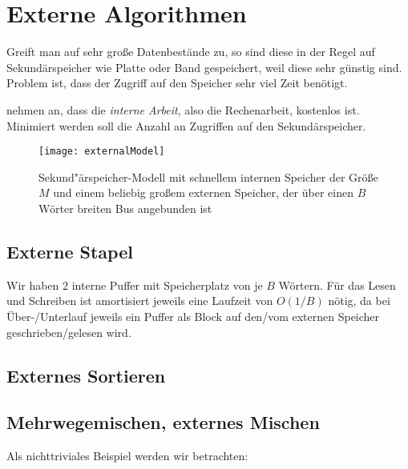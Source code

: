 \chapter{Externe Algorithmen}

\begin{minipage}{.6\textwidth}
  Greift man auf sehr große Datenbestände zu, so sind diese in der Regel auf Sekundärspeicher wie Platte oder Band gespeichert, weil diese sehr günstig sind. Problem ist, dass der Zugriff auf den Speicher sehr viel Zeit benötigt.
  
   nehmen an, dass die \emph{interne Arbeit}, also die Rechenarbeit, kostenlos ist. Minimiert werden soll die Anzahl an Zugriffen auf den Sekundärspeicher.
\end{minipage}
\hfill
\begin{minipage}{.35\textwidth}
  \begin{figure}[H]
    \texttt{[image: externalModel]}
    \caption{Sekund"ärspeicher-Modell mit schnellem internen Speicher der Größe \( M \) und einem beliebig großem externen Speicher, der über einen \( B \) Wörter breiten Bus angebunden ist}
  \end{figure}
\end{minipage}

\section{Externe Stapel}
Wir haben 2 interne Puffer mit Speicherplatz von je $B$ Wörtern. Für das Lesen und Schreiben ist amortisiert jeweils eine Laufzeit von $O(1/B)$ nötig, da bei Über-/Unterlauf jeweils ein Puffer als Block auf den/vom externen Speicher geschrieben/gelesen wird.

\section{Externes Sortieren}

\section{Mehrwegemischen, externes Mischen}

Als nichttriviales Beispiel werden wir  betrachten:

